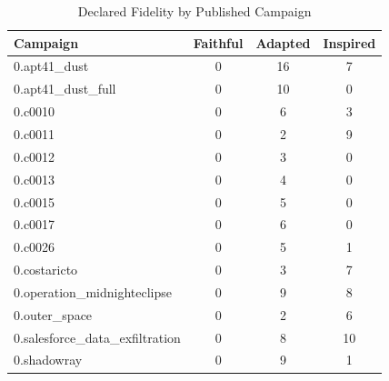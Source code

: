 \begin{table}[htbp]
\centering
\caption{Declared Fidelity by Published Campaign}
\label{tab:fidelity}
\begin{tabular}{lccc}
\toprule
Campaign & Faithful & Adapted & Inspired \\
\midrule
0.apt41_dust & 0 & 16 & 7 \\
0.apt41_dust_full & 0 & 10 & 0 \\
0.c0010 & 0 & 6 & 3 \\
0.c0011 & 0 & 2 & 9 \\
0.c0012 & 0 & 3 & 0 \\
0.c0013 & 0 & 4 & 0 \\
0.c0015 & 0 & 5 & 0 \\
0.c0017 & 0 & 6 & 0 \\
0.c0026 & 0 & 5 & 1 \\
0.costaricto & 0 & 3 & 7 \\
0.operation_midnighteclipse & 0 & 9 & 8 \\
0.outer_space & 0 & 2 & 6 \\
0.salesforce_data_exfiltration & 0 & 8 & 10 \\
0.shadowray & 0 & 9 & 1 \\
\bottomrule
\end{tabular}
\end{table}
